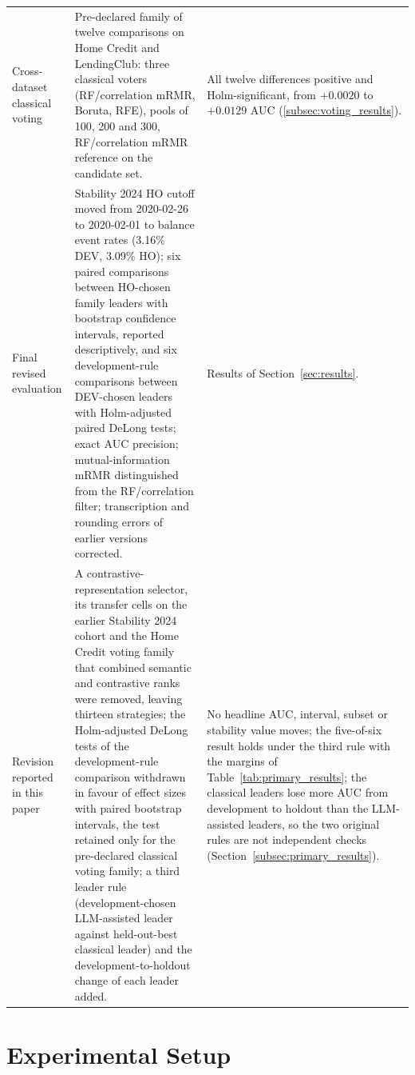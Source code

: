 \documentclass[final,5p,twocolumn]{elsarticle}
\begin{document}
\begin{table}[htbp]
\begin{threeparttable}
\begin{tabular}{@{}L{27mm}L{\dimexpr(\textwidth-27mm-4\tabcolsep)/2\relax}L{\dimexpr(\textwidth-27mm-4\tabcolsep)/2\relax}@{}}
\addlinespace
Cross-dataset classical voting & Pre-declared family of twelve comparisons on Home Credit and LendingClub: three classical voters (RF/correlation mRMR, Boruta, RFE), pools of 100, 200 and 300, RF/correlation mRMR reference on the candidate set. & All twelve differences positive and Holm-significant, from $+0.0020$ to $+0.0129$ AUC (\ref{subsec:voting_results}). \\
\addlinespace
Final revised evaluation & Stability 2024 HO cutoff moved from 2020-02-26 to 2020-02-01 to balance event rates (3.16\% DEV, 3.09\% HO); six paired comparisons between HO-chosen family leaders with bootstrap confidence intervals, reported descriptively, and six development-rule comparisons between DEV-chosen leaders with Holm-adjusted paired DeLong tests; exact AUC precision; mutual-information mRMR distinguished from the RF/correlation filter; transcription and rounding errors of earlier versions corrected. & Results of Section~\ref{sec:results}. \\
\addlinespace
Revision reported in this paper & A contrastive-representation selector, its transfer cells on the earlier Stability 2024 cohort and the Home Credit voting family that combined semantic and contrastive ranks were removed, leaving thirteen strategies; the Holm-adjusted DeLong tests of the development-rule comparison withdrawn in favour of effect sizes with paired bootstrap intervals, the test retained only for the pre-declared classical voting family; a third leader rule (development-chosen LLM-assisted leader against held-out-best classical leader) and the development-to-holdout change of each leader added. & No headline AUC, interval, subset or stability value moves; the five-of-six result holds under the third rule with the margins of Table~\ref{tab:primary_results}; the classical leaders lose more AUC from development to holdout than the LLM-assisted leaders, so the two original rules are not independent checks (Section~\ref{subsec:primary_results}). \\
\bottomrule
\end{tabular}
\end{threeparttable}
\end{table}


\section{Experimental Setup}
\label{sec:experimental_setup}
\end{document}
